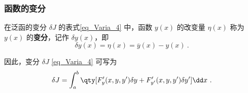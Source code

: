 \subsubsection{函数的变分}
在泛函的变分 $\delta J$ 的表式\autoref{eq_Varia_4} 中，函数 $y(x)$ 的改变量 $\eta(x)$ 称为 $y(x)$ 的\textbf{变分}，记作 $\delta y(x)$，即
\begin{equation}\label{eq_Varia_6}
\delta y(x)=\eta(x)=\overline{y}(x)-y(x)~.
\end{equation}

因此，变分 $\delta J$ \autoref{eq_Varia_4} 可写为
\begin{equation}\label{eq_Varia_5}
\delta J=\int_a^b\qty[F'_y(x,y,y')\delta y+F'_{y'}(x,y,y')\delta y']\dd x~.
\end{equation}
